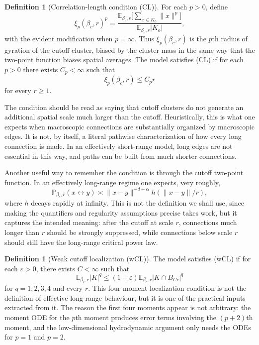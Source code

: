 \documentclass[11pt,reqno]{book}
\numberwithin{equation}{chapter}
\theoremstyle{plain}
\theoremstyle{definition}
\newtheorem{defn}[theorem]{Definition}
\theoremstyle{remark}
\renewcommand{\P}{\mathbb P}
\newcommand{\E}{\mathbb E}
\newcommand{\eps}{\varepsilon}
\newcommand{\1}{\mathbf 1}
\newcommand{\norm}[1]{\lVert #1\rVert}
\begin{document}
\begin{defn}[Correlation-length condition (CL)]
For each \(p>0\), define
\[
  \xi_p(\beta_c,r)^p
  =
  \frac{
    \E_{\beta_c,r}\bigl[\sum_{x\in K_o}\norm{x}^p\bigr]
  }{
    \E_{\beta_c,r}|K_o|
  },
\]
with the evident modification when \(p=\infty\). Thus \(\xi_p(\beta_c,r)\) is the \(p\)th radius of gyration of the cutoff cluster, biased by the cluster mass in the same way that the two-point function biases spatial averages. The model satisfies (CL) if for each \(p>0\) there exists \(C_p<\infty\) such that
\[
  \xi_p(\beta_c,r)\leq C_p r
\]
for every $r\geq 1$.
\end{defn}

The condition should be read as saying that cutoff clusters do not generate an additional spatial scale much larger than the cutoff. Heuristically, this is what one expects when macroscopic connections are substantially organized by macroscopic edges. It is not, by itself, a literal pathwise characterization of how every long connection is made. In an effectively short-range model, long edges are not essential in this way, and paths can be built from much shorter connections.

Another useful way to remember the condition is through the cutoff two-point function. In an effectively long-range regime one expects, very roughly,
\[
  \P_{\beta_c,r}(x\leftrightarrow y)
  \asymp
  \norm{x-y}^{-d+\alpha}h(\norm{x-y}/r),
\]
where \(h\) decays rapidly at infinity. This is not the definition we shall use, since making the quantifiers and regularity assumptions precise takes work, but it captures the intended meaning: after the cutoff at scale \(r\), connections much longer than \(r\) should be strongly suppressed, while connections below scale \(r\) should still have the long-range critical power law.

\begin{defn}[Weak cutoff localization (wCL)]
The model satisfies (wCL) if for each \(\eps>0\), there exists
\(C<\infty\) such that
\[
  \E_{\beta_c,r}|K|^q
  \leq
  (1+\eps)\E_{\beta_c,r}|K\cap B_{Cr}|^q
\]
for \(q=1,2,3,4\) and every \(r\). This four-moment localization condition is not the definition of effective long-range behaviour, but it is one of the practical inputs extracted from it. The reason the first four moments appear is not arbitrary: the moment ODE for the \(p\)th moment produces error terms involving the \((p+2)\)th moment, and the low-dimensional hydrodynamic argument only needs the ODEs for \(p=1\) and \(p=2\).
\end{defn}
\end{document}
